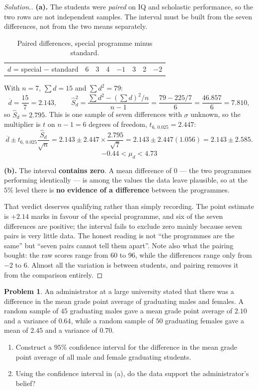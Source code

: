\documentclass[11pt,a4paper]{article}
\theoremstyle{definition}
\newtheorem{problemx}{Problem}[section]
\newenvironment{problem}{\begin{problemx}}{\end{problemx}}
\newenvironment{solution}
  {\renewcommand{\qedsymbol}{}\begin{proof}[\textit{Solution}.]}
  {\end{proof}}
\begin{document}
\begin{solution}
\textbf{(a).} The students were \emph{paired} on IQ and scholastic performance, so the two
rows are not independent samples. The interval must be built from the seven differences,
not from the two means separately.
\begin{table}[H]
\centering
\begin{tabular}{l|ccccccc}
$d$ = special $-$ standard & 6 & 3 & 4 & $-1$ & 3 & 2 & $-2$\\
\end{tabular}
\caption{Paired differences, special programme minus standard.}
\end{table}
With $n=7$, $\sum d=15$ and $\sum d^2=79$:
\[\overline{d}=\frac{15}{7}=2.143,\qquad
\hat{S}_d^2=\frac{\sum d^2-(\sum d)^2/n}{n-1}=\frac{79-225/7}{6}=\frac{46.857}{6}=7.810,\]
so $\hat{S}_d=2.795$. This is one sample of seven differences with $\sigma$ unknown, so the
multiplier is $t$ on $n-1=6$ degrees of freedom, $t_{6,\,0.025}=2.447$:
\[\overline{d}\pm t_{6,\,0.025}\frac{\hat{S}_d}{\sqrt{n}}
=2.143\pm 2.447\times\frac{2.795}{\sqrt{7}}
=2.143\pm 2.447(1.056)
=2.143\pm 2.585.\]
\[-0.44<\mu_d<4.73\]

\textbf{(b).} The interval \textbf{contains zero}. A mean difference of $0$ --- the two
programmes performing identically --- is among the values the data leave plausible, so at
the $5\%$ level there is \textbf{no evidence of a difference} between the programmes.

That verdict deserves qualifying rather than simply recording. The point estimate is
$+2.14$ marks in favour of the special programme, and six of the seven differences are
positive; the interval fails to exclude zero mainly because seven pairs is very little
data. The honest reading is not ``the programmes are the same'' but ``seven pairs cannot
tell them apart''. Note also what the pairing bought: the raw scores range from $60$ to
$96$, while the differences range only from $-2$ to $6$. Almost all the variation is
between students, and pairing removes it from the comparison entirely.
\end{solution}

\begin{problem}
An administrator at a large university stated that there was a difference in the mean grade
point average of graduating males and females. A random sample of $45$ graduating males
gave a mean grade point average of $2.10$ and a variance of $0.64$, while a random sample of
$50$ graduating females gave a mean of $2.45$ and a variance of $0.70$.
\begin{enumerate}
\item[(a).] Construct a $95\%$ confidence interval for the difference in the mean grade
point average of all male and female graduating students.
\item[(b).] Using the confidence interval in (a), do the data support the administrator's
belief?
\end{enumerate}
\end{problem}
\end{document}
